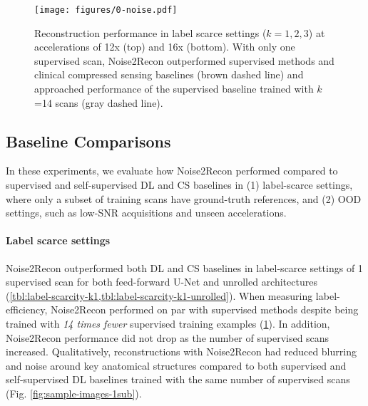 \documentclass[10pt,twocolumn,letterpaper]{article}
\newcommand{\RV}[1]{{#1}}
\begin{document}
\begin{figure}[t!]
  \centering
  \begin{center}
      \texttt{[image: figures/0-noise.pdf]}
  \end{center}
  \caption{Reconstruction performance in label scarce settings ($k=1,2,3$) at accelerations of 12x (top) and 16x (bottom). With only one supervised scan, Noise2Recon outperformed supervised methods and clinical compressed sensing baselines (brown dashed line) and approached performance of the supervised baseline trained with $k$=14 scans (gray dashed line).}
  \label{fig:label-scarcity-bar}
\end{figure}


\subsection{Baseline Comparisons}
In these experiments, we evaluate how Noise2Recon performed compared to supervised and self-supervised DL and CS baselines in (1) label-scarce settings, where only a subset of training scans have ground-truth references, and (2) OOD settings, such as low-SNR acquisitions and unseen accelerations.

\label{sec:results-baseline}
\paragraph{Label scarce settings} Noise2Recon outperformed both DL and CS baselines in label-scarce settings of 1 supervised scan \RV{for both feed-forward U-Net and unrolled architectures (\cref{tbl:label-scarcity-k1,tbl:label-scarcity-k1-unrolled})}. When measuring label-efficiency, Noise2Recon performed on par with supervised methods despite being trained with \textit{14 times fewer} supervised training examples (\cref{fig:label-scarcity-bar}). In addition, Noise2Recon performance did not drop as the number of supervised scans increased. Qualitatively, reconstructions with Noise2Recon had reduced blurring and noise around key anatomical structures compared to both supervised and self-supervised DL baselines trained with the same number of supervised scans (Fig. \ref{fig:sample-images-1sub}).
\end{document}
